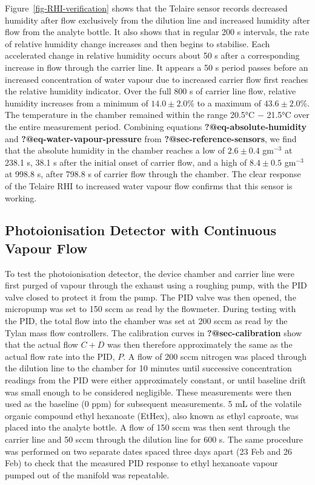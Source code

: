 \documentclass[
  a4paper,
]{scrbook}
\begin{document}
Figure~\ref{fig-RHI-verification} shows that the Telaire sensor records
decreased humidity after flow exclusively from the dilution line and
increased humidity after flow from the analyte bottle. It also shows
that in regular 200 s intervals, the rate of relative humidity change
increases and then begins to stabilise. Each accelerated change in
relative humidity occurs about 50 s after a corresponding increase in
flow through the carrier line. It appears a 50 s period passes before an
increased concentration of water vapour due to increased carrier flow
first reaches the relative humidity indicator. Over the full 800 s of
carrier line flow, relative humidity increases from a minimum of
\(14.0 \pm 2.0\)\% to a maximum of \(43.6 \pm 2.0\)\%. The temperature
in the chamber remained within the range 20.5°C \(-\) 21.5°C over the
entire measurement period. Combining equations
\textbf{?@eq-absolute-humidity} and \textbf{?@eq-water-vapour-pressure}
from \textbf{?@sec-reference-sensors}, we find that the absolute
humidity in the chamber reaches a low of \(2.6\pm0.4\) gm\(^{-3}\) at
238.1 s, 38.1 s after the initial onset of carrier flow, and a high of
\(8.4 \pm 0.5\) gm\(^{-3}\) at 998.8 s, after 798.8 s of carrier flow
through the chamber. The clear response of the Telaire RHI to increased
water vapour flow confirms that this sensor is working.

\hypertarget{photoionisation-detector-with-continuous-vapour-flow}{%
\subsection{Photoionisation Detector with Continuous Vapour
Flow}\label{photoionisation-detector-with-continuous-vapour-flow}}

To test the photoionisation detector, the device chamber and carrier
line were first purged of vapour through the exhaust using a roughing
pump, with the PID valve closed to protect it from the pump. The PID
valve was then opened, the micropump was set to 150 sccm as read by the
flowmeter. During testing with the PID, the total flow into the chamber
was set at 200 sccm as read by the Tylan mass flow controllers. The
calibration curves in \textbf{?@sec-calibration} show that the actual
flow \(C + D\) was then therefore approximately the same as the actual
flow rate into the PID, \(P\). A flow of 200 sccm nitrogen was placed
through the dilution line to the chamber for 10 minutes until successive
concentration readings from the PID were either approximately constant,
or until baseline drift was small enough to be considered negligible.
These measurements were then used as the baseline (0 ppm) for subsequent
measurements. 5 mL of the volatile organic compound ethyl hexanoate
(EtHex), also known as ethyl caproate, was placed into the analyte
bottle. A flow of 150 sccm was then sent through the carrier line and 50
sccm through the dilution line for 600 s. The same procedure was
performed on two separate dates spaced three days apart (23 Feb and 26
Feb) to check that the measured PID response to ethyl hexanoate vapour
pumped out of the manifold was repeatable.
\end{document}
